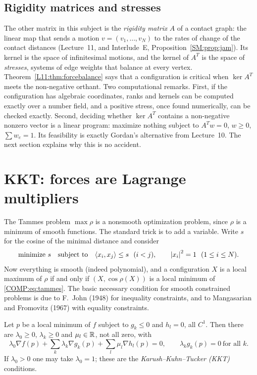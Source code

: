 \subsection{Rigidity matrices and stresses}
The other matrix in this subject is the \emph{rigidity matrix} $A$ of a contact graph: the linear map that
sends a motion $v=(v_1,\dots,v_N)$ to the rates of change of the contact distances (Lecture~11, and
Interlude~E, Proposition~\ref{SM:prop:jam}). Its kernel is the space of infinitesimal motions, and the
kernel of $A^T$ is the space of \emph{stresses}, systems of edge weights that balance at every vertex.
Theorem~\ref{L11:thm:forcebalance} says that a configuration is critical when $\ker A^T$ meets the
non-negative orthant. Two computational remarks. First, if the configuration has algebraic coordinates,
ranks and kernels can be computed exactly over a number field, and a positive stress, once found
numerically, can be checked exactly. Second, deciding whether $\ker A^T$ contains a non-negative nonzero
vector is a linear program: maximize nothing subject to $A^Tw=0$, $w\ge0$, $\sum w_e=1$. Its feasibility
is exactly Gordan's alternative from Lecture~10. The next section explains why this is no accident.

\section{KKT: forces are Lagrange multipliers}
\label{COMP:sec:kkt}

The Tammes problem $\max\rho$ is a nonsmooth optimization problem, since $\rho$ is a minimum of smooth
functions. The standard trick is to add a variable. Write $s$ for the cosine of the minimal distance and
consider
\begin{equation}\label{COMP:eq:tammes}
  \text{minimize } s\quad\text{subject to}\quad \ip{x_i}{x_j}\le s\ \ (i<j),\qquad \abs{x_i}^2=1\ \ (1\le i\le N).
\end{equation}
Now everything is smooth (indeed polynomial), and a configuration $X$ is a local maximum of $\rho$ if and
only if $(X,\cos\rho(X))$ is a local minimum of \eqref{COMP:eq:tammes}. The basic necessary condition for
smooth constrained problems is due to F.~John (1948) for inequality constraints, and to Mangasarian and
Fromovitz (1967) with equality constraints.

\begin{theorem}
Let $p$ be a local minimum of $f$ subject to $g_k\le0$ and $h_l=0$, all $C^1$. Then there are
$\lambda_0\ge0$, $\lambda_k\ge0$ and $\mu_l\in\mathbb{R}$, not all zero, with
\[
  \lambda_0\nabla f(p)+\sum_k\lambda_k\nabla g_k(p)+\sum_l\mu_l\nabla h_l(p)=0,\qquad \lambda_kg_k(p)=0\ \text{for all }k.
\]
If $\lambda_0>0$ one may take $\lambda_0=1$; these are the \emph{Karush--Kuhn--Tucker (KKT)} conditions.
\end{theorem}


